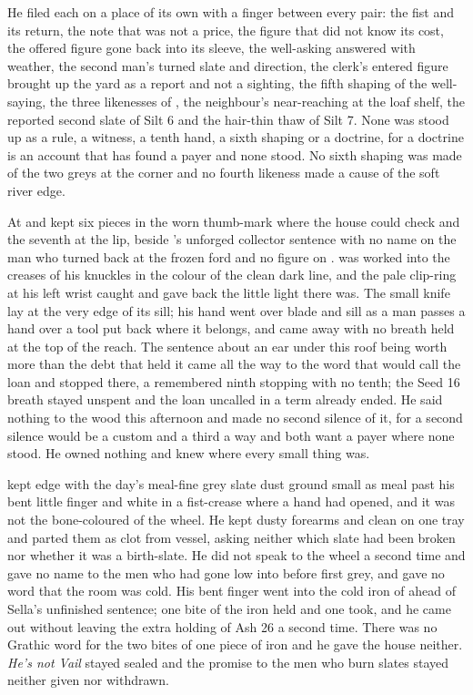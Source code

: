 He filed each on a place of its own with a finger between every pair: the fist and its return, the note that was not a price, the figure that did not know its cost, the offered figure gone back into its sleeve, the well-asking answered with weather, the second man's turned slate and direction, the clerk's entered figure brought up the yard as a report and not a sighting, the fifth shaping of the well-saying, the three likenesses of , the neighbour's near-reaching at the loaf shelf, the reported second slate of Silt 6 and the hair-thin thaw of Silt 7. None was stood up as a rule, a witness, a tenth hand, a sixth shaping or a doctrine, for a doctrine is an account that has found a payer and none stood. No sixth shaping was made of the two greys at the corner and no fourth likeness made a cause of the soft river edge.

At  and   kept six pieces in the worn thumb-mark where the house could check and the seventh at the lip, beside 's unforged collector sentence with no name on the man who turned back at the frozen ford and no figure on .  was worked into the creases of his knuckles in the colour of the clean dark line, and the pale clip-ring at his left wrist caught and gave back the little light there was. The small knife lay at the very edge of its sill; his hand went over blade and sill as a man passes a hand over a tool put back where it belongs, and came away with no breath held at the top of the reach. The sentence about an ear under this roof being worth more than the debt that held it came all the way to the word that would call the loan and stopped there, a remembered ninth stopping with no tenth; the Seed 16 breath stayed unspent and the loan uncalled in a term already ended. He said nothing to the wood this afternoon and made no second silence of it, for a second silence would be a custom and a third a way and both want a payer where none stood. He owned nothing and knew where every small thing was.

 kept  edge with the day's meal-fine grey slate dust ground small as meal past his bent little finger and white in a fist-crease where a hand had opened, and it was not the bone-coloured  of the wheel. He kept dusty forearms and clean on one tray and parted them as clot from vessel, asking neither which slate had been broken nor whether it was a birth-slate. He did not speak to the wheel a second time and gave no name to the men who had gone low into  before first grey, and gave no word that the room was cold. His bent finger went into the cold iron of  ahead of Sella's unfinished sentence; one bite of the iron held and one took, and he came out without leaving the extra holding of Ash 26 a second time. There was no Grathic word for the two bites of one piece of iron and he gave the house neither. \emph{He's not Vail} stayed sealed and the promise to the men who burn slates stayed neither given nor withdrawn.

